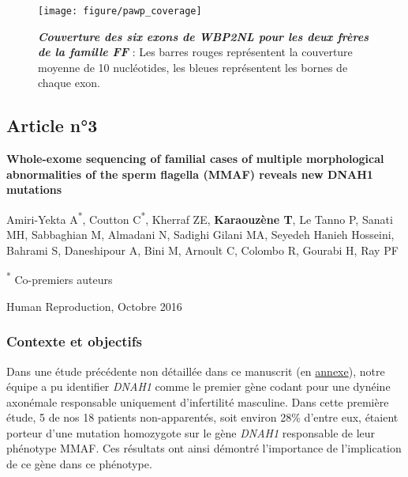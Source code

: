 \documentclass[12pt,a4paper,twoside]{ugathesis}
\begin{document}
\begin{figure}

{\centering \texttt{[image: figure/pawp\_coverage]} 

}

\caption[Couverture des six exons de \emph{WBP2NL} pour
les deux frères de la famille FF\\]{\textbf{\emph{Couverture des six exons de
\emph{WBP2NL} pour les deux frères de la famille FF}} : Les barres
rouges représentent la couverture moyenne de 10 nucléotides, les bleues
représentent les bornes de chaque exon.}\label{fig:plotcovplcz}
\end{figure}








\newpage

\subsection{Article n°3}\label{article-n3}

\textbf{Whole-exome sequencing of familial cases of multiple
morphological abnormalities of the sperm flagella (MMAF) reveals new
DNAH1 mutations}

Amiri-Yekta A\textsuperscript{*}, Coutton C\textsuperscript{*}, Kherraf
ZE, \textbf{Karaouzène T}, Le Tanno P, Sanati MH, Sabbaghian M, Almadani
N, Sadighi Gilani MA, Seyedeh Hanieh Hosseini, Bahrami S, Daneshipour A,
Bini M, Arnoult C, Colombo R, Gourabi H, Ray PF

\textsuperscript{*} Co-premiers auteurs

Human Reproduction, Octobre 2016

\newpage

\subsubsection{Contexte et objectifs}\label{contexte-et-objectifs-2}

Dans une étude précédente non détaillée dans ce manuscrit (en
\protect\hyperlink{dnah12014}{annexe}), notre équipe a pu identifier
\emph{DNAH1} comme le premier gène codant pour une dynéine axonémale
responsable uniquement d'infertilité masculine. Dans cette première
étude, 5 de nos 18 patients non-apparentés, soit environ 28\% d'entre
eux, étaient porteur d'une mutation homozygote sur le gène \emph{DNAH1}
responsable de leur phénotype MMAF. Ces résultats ont ainsi démontré
l'importance de l'implication de ce gène dans ce phénotype.
\end{document}
